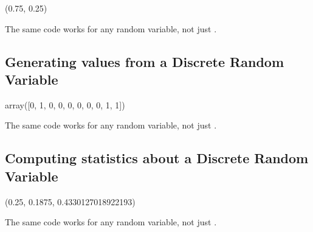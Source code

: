 \documentclass[letterpaper,10pt,english]{sphinxmanual}
\begin{document}
\begin{sphinxVerbatim}[commandchars=\\\{\}]
(0.75, 0.25)
\end{sphinxVerbatim}

The same code works for any random variable, not just .


\subsection{Generating values from a Discrete Random Variable}
\label{\detokenize{GB213-review-in-Python:generating-values-from-a-discrete-random-variable}}
\begin{sphinxVerbatim}[commandchars=\\\{\}]
    
\end{sphinxVerbatim}

\begin{sphinxVerbatim}[commandchars=\\\{\}]
array([0, 1, 0, 0, 0, 0, 0, 0, 1, 1])
\end{sphinxVerbatim}

The same code works for any random variable, not just .


\subsection{Computing statistics about a Discrete Random Variable}
\label{\detokenize{GB213-review-in-Python:computing-statistics-about-a-discrete-random-variable}}
\begin{sphinxVerbatim}[commandchars=\\\{\}]
    
\end{sphinxVerbatim}

\begin{sphinxVerbatim}[commandchars=\\\{\}]
(0.25, 0.1875, 0.4330127018922193)
\end{sphinxVerbatim}

The same code works for any random variable, not just .
\end{document}
